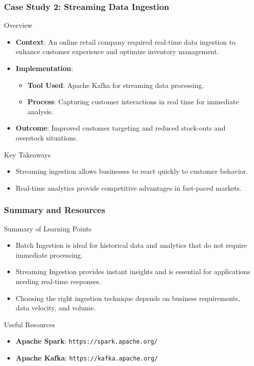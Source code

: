 \documentclass[aspectratio=169]{beamer}
\begin{document}
\begin{frame}[fragile]
    \frametitle{Case Study 2: Streaming Data Ingestion}
    \begin{block}{Overview}
        \begin{itemize}
            \item \textbf{Context}: An online retail company required real-time data ingestion to enhance customer experience and optimize inventory management.
            \item \textbf{Implementation}:
                \begin{itemize}
                    \item \textbf{Tool Used}: Apache Kafka for streaming data processing.
                    \item \textbf{Process}: Capturing customer interactions in real time for immediate analysis.
                \end{itemize}
            \item \textbf{Outcome}: Improved customer targeting and reduced stock-outs and overstock situations.
        \end{itemize}
    \end{block}
    
    \begin{block}{Key Takeaways}
        \begin{itemize}
            \item Streaming ingestion allows businesses to react quickly to customer behavior.
            \item Real-time analytics provide competitive advantages in fast-paced markets.
        \end{itemize}
    \end{block}
\end{frame}

\begin{frame}[fragile]
    \frametitle{Summary and Resources}
    \begin{block}{Summary of Learning Points}
        \begin{itemize}
            \item Batch Ingestion is ideal for historical data and analytics that do not require immediate processing.
            \item Streaming Ingestion provides instant insights and is essential for applications needing real-time responses.
            \item Choosing the right ingestion technique depends on business requirements, data velocity, and volume.
        \end{itemize}
    \end{block}

    \begin{block}{Useful Resources}
        \begin{itemize}
            \item \textbf{Apache Spark}: \texttt{https://spark.apache.org/}
            \item \textbf{Apache Kafka}: \texttt{https://kafka.apache.org/}
        \end{itemize}
    \end{block}
\end{frame}
\end{document}
